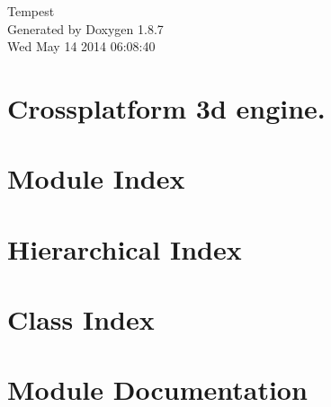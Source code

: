 \documentclass[twoside]{book}
\newcommand{\+}{\discretionary{\mbox{\scriptsize$\hookleftarrow$}}{}{}}
\newcommand{\clearemptydoublepage}{%
  \newpage{\pagestyle{empty}\cleardoublepage}%
}
\begin{document}
\hypersetup{pageanchor=false,
             bookmarks=true,
             bookmarksnumbered=true,
             pdfencoding=unicode
            }
\begin{titlepage}
\vspace*{7cm}
\begin{center}%
{\Large Tempest }\\
\vspace*{1cm}
{\large Generated by Doxygen 1.8.7}\\
\vspace*{0.5cm}
{\small Wed May 14 2014 06:08:40}\\
\end{center}
\end{titlepage}
\clearemptydoublepage
\tableofcontents
\clearemptydoublepage
{}
\hypersetup{pageanchor=true}

\chapter{Crossplatform 3d engine.}
\label{index}\hypertarget{index}{}
\chapter{Module Index}

\chapter{Hierarchical Index}

\chapter{Class Index}

\chapter{Module Documentation}

\end{document}
